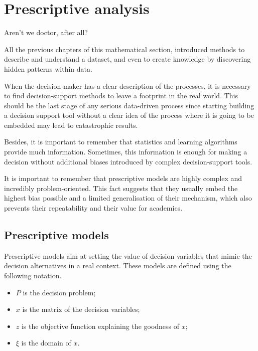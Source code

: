 \chapter{Prescriptive analysis}{Aren’t we doctor, after all?}

All the previous chapters of this mathematical section, introduced methods to describe and understand a dataset, and even to create knowledge by discovering hidden patterns within data.\par

When the decision-maker has a clear description of the processes, it is necessary to find decision-support methods to leave a footprint in the real world. This should be the last stage of any serious data-driven process since starting building a decision support tool without a clear idea of the process where it is going to be embedded may lead to catastrophic results.\par

Besides, it is important to remember that statistics and learning algorithms provide much information. Sometimes, this information is enough for making a decision without additional biases introduced by complex decision-support tools.\par

It is important to remember that prescriptive models are highly complex and incredibly problem-oriented. This fact suggests that they usually embed the highest bias possible and a limited generalisation of their mechanism, which also prevents their repeatability and their value for academics.\par

\section{Prescriptive models}
Prescriptive models aim at setting the value of decision variables that mimic the decision alternatives in a real context. These models are defined using the following notation.

\begin{itemize}
    \item $P$ is the decision problem;
    \item $x$ is the matrix of the decision variables;
    \item $z$ is the objective function explaining the goodness of $x$;
    \item $\xi$ is the domain of $x$.
\end{itemize}

